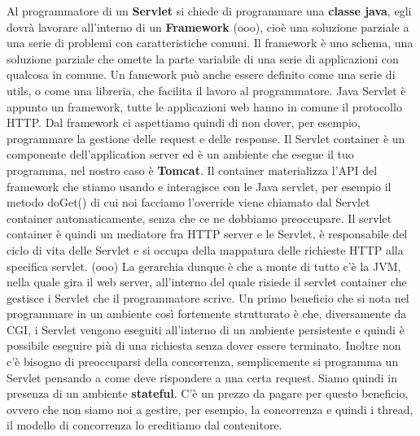 Al programmatore di un \textbf{Servlet} si chiede di programmare una \textbf{classe java}, egli dovrà lavorare all'interno di un \textbf{Framework} (ooo), cioè una soluzione parziale a una serie di problemi con caratteristiche comuni. Il framework è uno schema, una soluzione parziale che omette la parte variabile di una serie di applicazioni con qualcosa in comune. Un famework può anche essere definito come una serie di utils, o come una libreria, che facilita il lavoro al programmatore.\newline
\newline
Java Servlet è appunto un framework, tutte le applicazioni web hanno in comune il protocollo HTTP. Dal framework ci aspettiamo quindi di non dover, per esempio, programmare la gestione delle request e delle response.\newline
\newline
Il Servlet container è un componente dell'application server ed è un ambiente che esegue il tuo programma, nel nostro caso è \textbf{Tomcat}. Il container materializza l'API del framework che stiamo usando e interagisce con le Java servlet, per esempio il metodo doGet() di cui noi facciamo l'override viene chiamato dal Servlet container automaticamente, senza che ce ne dobbiamo preoccupare. Il servlet container è quindi un mediatore fra HTTP server e le Servlet, è responsabile del ciclo di vita delle Servlet e si occupa della mappatura delle richieste HTTP alla specifica servlet.\newline
\newline
(ooo) La gerarchia dunque è che a monte di tutto c'è la JVM, nella quale gira il web server, all'interno del quale risiede il servlet container che gestisce i Servlet che il programmatore scrive.\newline
\newline
Un primo beneficio che si nota nel programmare in un ambiente così fortemente strutturato è che, diversamente da CGI, i Servlet vengono eseguiti all'interno di un ambiente persistente e quindi è possibile eseguire più di una richiesta senza dover essere terminato.\newline
Inoltre non c'è bisogno di preoccuparsi della concorrenza, semplicemente si programma un Servlet pensando a come deve rispondere a una certa request. Siamo quindi in presenza di un ambiente \textbf{stateful}.\newline
\newline
C'è un prezzo da pagare per questo beneficio, ovvero che non siamo noi a gestire, per esempio, la concorrenza e quindi i thread, il modello di concorrenza lo ereditiamo dal contenitore.\newline
